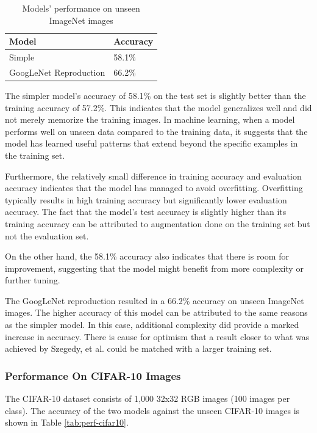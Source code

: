 \documentclass{article}
\begin{document}
\begin{table}[ht]
    \centering
    \begin{tabular}{ll}
    \hline
    \textbf{Model} & \textbf{Accuracy} \\ \hline
    Simple & 58.1\% \\ \hline
    GoogLeNet Reproduction & 66.2\% \\ \hline
    \end{tabular}
    \caption{Models' performance on unseen ImageNet images}
    \label{tab:perf-unseen-imagenet}
\end{table}

The simpler model's accuracy of 58.1\% on the test set is slightly better than the training accuracy of 57.2\%. This indicates that the model generalizes well and did not merely memorize the training images. In machine learning, when a model performs well on unseen data compared to the training data, it suggests that the model has learned useful patterns that extend beyond the specific examples in the training set.

Furthermore, the relatively small difference in training accuracy and evaluation accuracy indicates that the model has managed to avoid overfitting. Overfitting typically results in high training accuracy but significantly lower evaluation accuracy. The fact that the model's test accuracy is slightly higher than its training accuracy can be attributed to augmentation done on the training set but not the evaluation set.

On the other hand, the 58.1\% accuracy also indicates that there is room for improvement, suggesting that the model might benefit from more complexity or further tuning.

The GoogLeNet reproduction resulted in a 66.2\% accuracy on unseen ImageNet images. The higher accuracy of this model can be attributed to the same reasons as the simpler model. In this case, additional complexity did provide a marked increase in accuracy. There is cause for optimism that a result closer to what was achieved by Szegedy, et al. could be matched with a larger training set.



\subsubsection{Performance On CIFAR-10 Images}
The CIFAR-10 dataset consists of 1,000 32x32 RGB images (100 images per class). The accuracy of the two models against the unseen CIFAR-10 images is shown in Table \ref{tab:perf-cifar10}.
\end{document}
